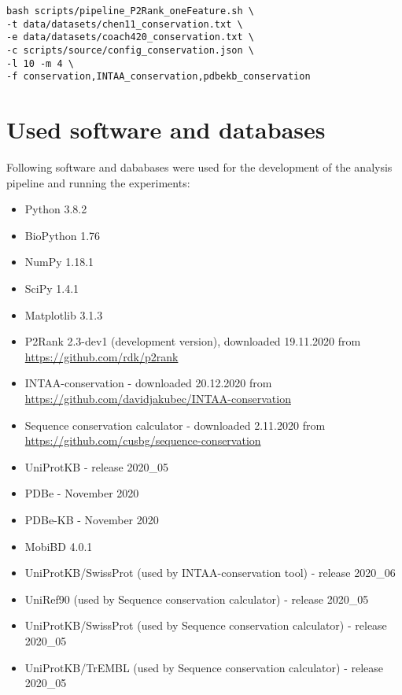 \documentclass[12pt,a4paper]{report}
\let\openright=\clearpage
\begin{document}
\begin{enumerate}
\begin{Verbatim}[fontsize=\small] 
bash scripts/pipeline_P2Rank_oneFeature.sh \ 
-t data/datasets/chen11_conservation.txt \
-e data/datasets/coach420_conservation.txt \
-c scripts/source/config_conservation.json \
-l 10 -m 4 \
-f conservation,INTAA_conservation,pdbekb_conservation
\end{Verbatim}

\end{enumerate}

\section{Used software and databases} \label{a:software}

Following software and dababases were used for the development of the analysis pipeline and running the experiments:

\begin{itemize}
\item Python 3.8.2
\item BioPython 1.76
\item NumPy 1.18.1
\item SciPy 1.4.1
\item Matplotlib 3.1.3
\item P2Rank 2.3-dev1 (development version), downloaded 19.11.2020 \newline from \url{https://github.com/rdk/p2rank}
\item INTAA-conservation - downloaded 20.12.2020 \newline from \url{https://github.com/davidjakubec/INTAA-conservation}
\item Sequence conservation calculator - downloaded 2.11.2020 \newline from \url{https://github.com/cusbg/sequence-conservation}
\item UniProtKB - release 2020\_05
\item PDBe - November 2020
\item PDBe-KB - November 2020
\item MobiBD 4.0.1
\item UniProtKB/SwissProt (used by INTAA-conservation tool) - release 2020\_06
\item UniRef90 (used by Sequence conservation calculator) - release 2020\_05
\item UniProtKB/SwissProt (used by Sequence conservation calculator) \newline - release 2020\_05
\item UniProtKB/TrEMBL (used by Sequence conservation calculator) \newline - release 2020\_05

\end{itemize}


\openright
\end{document}
